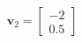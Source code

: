 \documentclass[preview]{standalone}
\begin{document}
\begin{align*}
\mathbf{v}_2=\begin{bmatrix} -2 \\ 0.5 \end{bmatrix}
\end{align*}
\end{document}
